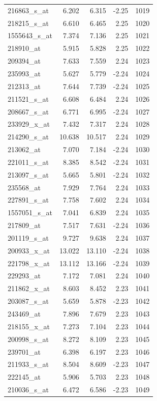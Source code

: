 \begin{footnotesize}
\begin{longtable}{lrrrr}
216863\_s\_at & 6.202 & 6.315 & -2.25 & 1019 \\
218215\_s\_at & 6.610 & 6.465 & 2.25 & 1020 \\
1555643\_s\_at & 7.374 & 7.136 & 2.25 & 1021 \\
218910\_at & 5.915 & 5.828 & 2.25 & 1022 \\
209394\_at & 7.633 & 7.559 & 2.24 & 1023 \\
235993\_at & 5.627 & 5.779 & -2.24 & 1024 \\
212313\_at & 7.644 & 7.739 & -2.24 & 1025 \\
211521\_s\_at & 6.608 & 6.484 & 2.24 & 1026 \\
208667\_s\_at & 6.771 & 6.995 & -2.24 & 1027 \\
233929\_x\_at & 7.432 & 7.317 & 2.24 & 1028 \\
214290\_s\_at & 10.638 & 10.517 & 2.24 & 1029 \\
213062\_at & 7.070 & 7.184 & -2.24 & 1030 \\
221011\_s\_at & 8.385 & 8.542 & -2.24 & 1031 \\
213097\_s\_at & 5.665 & 5.801 & -2.24 & 1032 \\
235568\_at & 7.929 & 7.764 & 2.24 & 1033 \\
227891\_s\_at & 7.758 & 7.602 & 2.24 & 1034 \\
1557051\_s\_at & 7.041 & 6.839 & 2.24 & 1035 \\
217809\_at & 7.517 & 7.631 & -2.24 & 1036 \\
201119\_s\_at & 9.727 & 9.638 & 2.24 & 1037 \\
200933\_x\_at & 13.022 & 13.110 & -2.24 & 1038 \\
221798\_x\_at & 13.112 & 13.166 & -2.24 & 1039 \\
229293\_at & 7.172 & 7.081 & 2.24 & 1040 \\
211862\_x\_at & 8.603 & 8.452 & 2.23 & 1041 \\
203087\_s\_at & 5.659 & 5.878 & -2.23 & 1042 \\
243469\_at & 7.896 & 7.679 & 2.23 & 1043 \\
218155\_x\_at & 7.273 & 7.104 & 2.23 & 1044 \\
200998\_s\_at & 8.272 & 8.109 & 2.23 & 1045 \\
239701\_at & 6.398 & 6.197 & 2.23 & 1046 \\
211933\_s\_at & 8.504 & 8.609 & -2.23 & 1047 \\
222145\_at & 5.906 & 5.703 & 2.23 & 1048 \\
210036\_s\_at & 6.472 & 6.586 & -2.23 & 1049 \\

\end{longtable}
\end{footnotesize}
